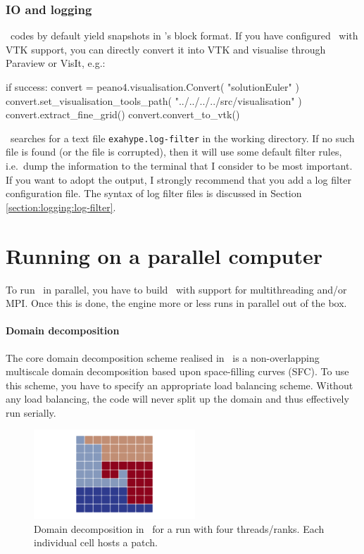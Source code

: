 \subsubsection{IO and logging}


\ExaHyPE\ codes by default yield snapshots in \Peano's block format. 
If you have configured \Peano\ with VTK support, you can directly convert it
into VTK and visualise through Paraview or VisIt, e.g.:
\begin{code}
if success:
  convert = peano4.visualisation.Convert( "solutionEuler" )
  convert.set_visualisation_tools_path( "../../../../src/visualisation" )
  convert.extract_fine_grid()
  convert.convert_to_vtk()
\end{code}


\ExaHyPE\ searches for a text file \texttt{exahype.log-filter} in the working
directory.
If no such file is found (or the file is corrupted), then it will use some
default filter rules, i.e.~dump the information to the terminal that I consider
to be most important.
If you want to adopt the output, I strongly recommend that you add a log filter
configuration file. 
The syntax of log filter files is discussed in Section
\ref{section:logging:log-filter}.



\section{Running on a parallel computer}

To run \ExaHyPE\ in parallel, you have to build \Peano\ with support for
multithreading and/or MPI.
Once this is done, the engine more or less runs in parallel out of the box.


\paragraph{Domain decomposition}
The core domain decomposition scheme realised in \ExaHyPE\ is a non-overlapping
multiscale domain decomposition based upon space-filling curves (SFC).
To use this scheme, you have to specify an appropriate load balancing scheme.
Without any load balancing, the code will never split up the domain and thus
effectively run serially.

\begin{figure}
 \begin{center}
  \includegraphics[width=0.54\textwidth]{60_exahype/domain-decomposition.png}
 \end{center}
 \caption{
  Domain decomposition in \ExaHyPE\ for a run with four threads/ranks. Each
  individual cell hosts a patch.
 }
\end{figure}


